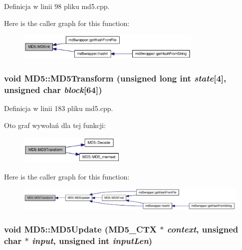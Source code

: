 Definicja w linii 98 pliku md5.cpp.

Here is the caller graph for this function:\nopagebreak
\begin{figure}[H]
\begin{center}
\leavevmode
\includegraphics[width=251pt]{d7/d46/a00002_72b35c041cb6983aaa74e2f1c31d5a29_icgraph}
\end{center}
\end{figure}
\hypertarget{a00002_849ad3347bad15a23f3a40452476b1e0}{
\subsubsection[{MD5Transform}]{\setlength{\rightskip}{0pt plus 5cm}void MD5::MD5Transform (unsigned long int {\em state}\mbox{[}4\mbox{]}, \/  unsigned char {\em block}\mbox{[}64\mbox{]})}}
\label{d7/d46/a00002_849ad3347bad15a23f3a40452476b1e0}




Definicja w linii 183 pliku md5.cpp.

Oto graf wywołań dla tej funkcji:\nopagebreak
\begin{figure}[H]
\begin{center}
\leavevmode
\includegraphics[width=145pt]{d7/d46/a00002_849ad3347bad15a23f3a40452476b1e0_cgraph}
\end{center}
\end{figure}


Here is the caller graph for this function:\nopagebreak
\begin{figure}[H]
\begin{center}
\leavevmode
\includegraphics[width=391pt]{d7/d46/a00002_849ad3347bad15a23f3a40452476b1e0_icgraph}
\end{center}
\end{figure}
\hypertarget{a00002_a59116f0a26354a217fa186a43cd9d28}{
\subsubsection[{MD5Update}]{\setlength{\rightskip}{0pt plus 5cm}void MD5::MD5Update ({\bf MD5\_\-CTX} $\ast$ {\em context}, \/  unsigned char $\ast$ {\em input}, \/  unsigned int {\em inputLen})}}
\label{d7/d46/a00002_a59116f0a26354a217fa186a43cd9d28}




